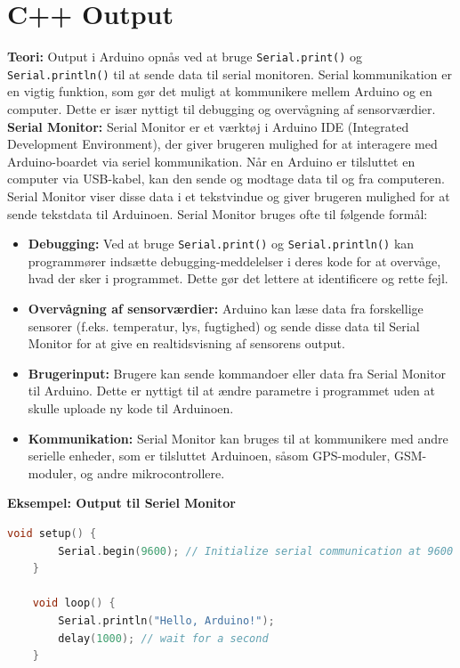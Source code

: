 \section{C++ Output}
\textbf{Teori:} Output i Arduino opnås ved at bruge \texttt{Serial.print()} og \texttt{Serial.println()} til at sende data til serial monitoren. Serial kommunikation er en vigtig funktion, som gør det muligt at kommunikere mellem Arduino og en computer. Dette er især nyttigt til debugging og overvågning af sensorværdier.
\newline\newline
\noindent\textbf{Serial Monitor:} Serial Monitor er et værktøj i Arduino IDE (Integrated Development Environment), der giver brugeren mulighed for at interagere med Arduino-boardet via seriel kommunikation. Når en Arduino er tilsluttet en computer via USB-kabel, kan den sende og modtage data til og fra computeren. Serial Monitor viser disse data i et tekstvindue og giver brugeren mulighed for at sende tekstdata til Arduinoen.
\newline\newline
\noindent Serial Monitor bruges ofte til følgende formål:
\begin{itemize}
	\item \textbf{Debugging:} Ved at bruge \texttt{Serial.print()} og \texttt{Serial.println()} kan programmører indsætte debugging-meddelelser i deres kode for at overvåge, hvad der sker i programmet. Dette gør det lettere at identificere og rette fejl.
	
	\item \textbf{Overvågning af sensorværdier:} Arduino kan læse data fra forskellige sensorer (f.eks. temperatur, lys, fugtighed) og sende disse data til Serial Monitor for at give en realtidsvisning af sensorens output.
	
	\item \textbf{Brugerinput:} Brugere kan sende kommandoer eller data fra Serial Monitor til Arduino. Dette er nyttigt til at ændre parametre i programmet uden at skulle uploade ny kode til Arduinoen.
	
	\item \textbf{Kommunikation:} Serial Monitor kan bruges til at kommunikere med andre serielle enheder, som er tilsluttet Arduinoen, såsom GPS-moduler, GSM-moduler, og andre mikrocontrollere.
\end{itemize}
\noindent\textbf{Eksempel: Output til Seriel Monitor}
\begin{lstlisting}[language=C++]
	void setup() {
		Serial.begin(9600); // Initialize serial communication at 9600 baud
	}
	
	void loop() {
		Serial.println("Hello, Arduino!");
		delay(1000); // wait for a second
	}
\end{lstlisting}

